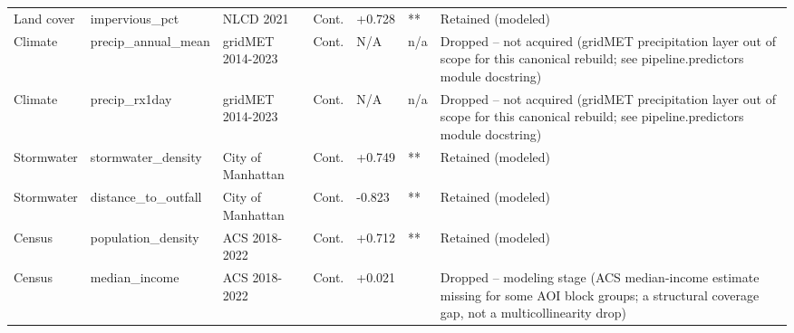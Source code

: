 \begin{tabular}{lllllll}
Land cover & impervious\_pct & NLCD 2021 & Cont. & +0.728 & ** & Retained (modeled) \\
Climate & precip\_annual\_mean & gridMET 2014-2023 & Cont. & N/A & n/a & Dropped -- not acquired (gridMET precipitation layer out of scope for this canonical rebuild; see pipeline.predictors module docstring) \\
Climate & precip\_rx1day & gridMET 2014-2023 & Cont. & N/A & n/a & Dropped -- not acquired (gridMET precipitation layer out of scope for this canonical rebuild; see pipeline.predictors module docstring) \\
Stormwater & stormwater\_density & City of Manhattan & Cont. & +0.749 & ** & Retained (modeled) \\
Stormwater & distance\_to\_outfall & City of Manhattan & Cont. & -0.823 & ** & Retained (modeled) \\
Census & population\_density & ACS 2018-2022 & Cont. & +0.712 & ** & Retained (modeled) \\
Census & median\_income & ACS 2018-2022 & Cont. & +0.021 &  & Dropped -- modeling stage (ACS median-income estimate missing for some AOI block groups; a structural coverage gap, not a multicollinearity drop) \\
\bottomrule
\end{tabular}
